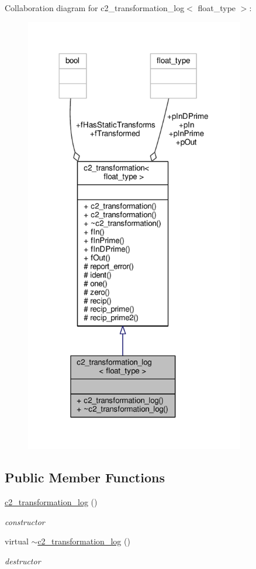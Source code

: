 Collaboration diagram for c2\+\_\+transformation\+\_\+log$<$ float\+\_\+type $>$\+:
\nopagebreak
\begin{figure}[H]
\begin{center}
\leavevmode
\includegraphics[width=272pt]{classc2__transformation__log__coll__graph}
\end{center}
\end{figure}
\subsection*{Public Member Functions}
\begin{DoxyCompactItemize}
\item 
\hyperlink{classc2__transformation__log_a80bcfa2e6f34214a74d2d910ffcb67c6}{c2\+\_\+transformation\+\_\+log} ()
\begin{DoxyCompactList}\small\item\em constructor \end{DoxyCompactList}\item 
virtual \hyperlink{classc2__transformation__log_adbd45864343f53409af79c41c8a03c5a}{$\sim$c2\+\_\+transformation\+\_\+log} ()
\begin{DoxyCompactList}\small\item\em destructor \end{DoxyCompactList}\end{DoxyCompactItemize}

